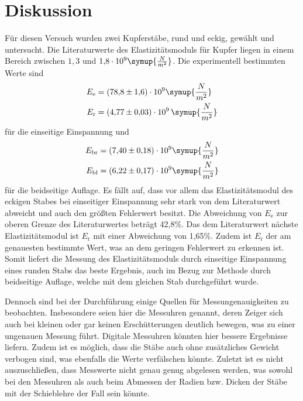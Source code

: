 \pagebreak

\section{Diskussion}
Für diesen Versuch wurden zwei Kupferstäbe, rund und eckig, gewählt und untersucht. Die Literaturwerte \cite{wiki} des Elastizitätsmoduls für Kupfer liegen in einem Bereich 
zwischen $1{,}3$ und $1{,}8 \cdot 10^9 \symup{\frac{N}{m^2}}$. Die experimentell bestimmten Werte sind
\begin{equation*}
\begin{aligned}
E_{\text{e}} &= (78{,}8 \pm 1{,}6)\cdot 10^9 \symup{\frac{N}{m^2}} \\
E_{\text{r}} &= (4{,}77 \pm 0{,}03)\cdot 10^9 \, \symup{\frac{N}{m^2}}
\end{aligned}
\end{equation*}
für die einseitige Einspannung und
\begin{equation*}
\begin{aligned}
E_{\text{br}} &= (7{,}40 \pm 0{,}18)\cdot 10^9 \symup{\frac{N}{m^2}} \\
E_{\text{bl}} &= (6{,}22 \pm 0{,}17)\cdot 10^9 \symup{\frac{N}{m^2}}
\end{aligned}
\end{equation*}
für die beidseitige Auflage. Es fällt auf, dass vor allem das Elastizitätsmodul des eckigen Stabes bei einseitiger Einspannung sehr stark von dem Literaturwert abweicht und auch den größten Fehlerwert besitzt. 
Die Abweichung von $E_{\text{e}}$ zur oberen Grenze des Literaturwertes beträgt 42,8\%. Das dem Literaturwert nächste Elastizitätsmodul ist $E_{\text{r}}$ mit einer Abweichung von 1,65\%. Zudem ist $E_{\text{r}}$ der am 
genauesten bestimmte Wert, was an dem geringen Fehlerwert zu erkennen ist. Somit liefert die Messung des Elastizitätsmoduls durch einseitige Einspannung eines runden Stabs das beste Ergebnis, auch im Bezug zur 
Methode durch beidseitige Auflage, welche mit dem gleichen Stab durchgeführt wurde.

Dennoch sind bei der Durchführung einige Quellen für Messungenauigkeiten zu beobachten. Insbesondere seien hier die Messuhren genannt, deren Zeiger sich auch bei kleinen oder gar keinen Erschütterungen deutlich bewegen, 
was zu einer ungenauen Messung führt. Digitale Messuhren könnten hier bessere Ergebnisse liefern. Zudem ist es möglich, dass die Stäbe auch ohne zusätzliches Gewicht verbogen sind, was ebenfalls die Werte verfälschen könnte.
Zuletzt ist es nicht auszuschließen, dass Messwerte nicht genau genug abgelesen werden, was sowohl bei den Messuhren als auch beim Abmessen der Radien bzw. Dicken der Stäbe mit der Schieblehre der Fall sein könnte.